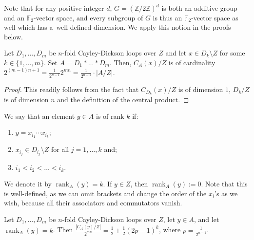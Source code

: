 \documentclass{jonasart}
\begin{document}
	Note that for any positive integer $d$, $G=(\mathbb{Z}/2\mathbb{Z})^d$ is both an additive group and an $\mathbb{F}_2$-vector space, and every subgroup of $G$ is thus an $\mathbb{F}_2$-vector space as well which has a~well-defined dimension. We apply this notion in the proofs below.

	\begin{proposition}\label{Cardinality}
		Let $D_1,\dots,D_m$ be $n$-fold Cayley-Dickson loops over $Z$ and let $x \in D_k \setminus Z$ for some $k \in \{1,\dots,m\}$. Set $A=D_1 \ast \dots \ast D_m$. Then, $C_A (x)/Z$ is of cardinality $2^{(m-1)n+1}=\frac{1}{2^{n-1}}2^{mn}=\frac{1}{2^{n-1}}\cdot|A/Z|$.
	\end{proposition}

	\begin{proof}
		This readily follows from the fact that $C_{D_k}(x)/Z$ is of dimension $1$, $D_k /Z$ is of dimension $n$ and the definition of the central product.
	\end{proof}

	We say that an element $y \in A$ is of rank $k$ if:
	\begin{enumerate}
		\item $y = x_{i_1}\cdots x_{i_k}$;
		\item $x_{i_j} \in D_{i_j}\setminus Z$ for all $j = 1,\dots,k$ and;
		\item $i_1 < i_2 < \dots < i_k$.
	\end{enumerate}
	We denote it by $\operatorname{rank}_A (y) = k$. If $y \in Z$, then $\operatorname{rank}_A (y):= 0$. Note that this is well-defined, as we can omit brackets and change the order of the $x_i$'s as we wish, because all their associators and commutators vanish.

	\begin{theorem}\label{recurrence}
		Let $D_1,\dots,D_m$ be $n$-fold Cayley-Dickson loops over $Z$, let $y \in A$, and let $\operatorname{rank}_A (y) = k$. Then $\frac{|C_A (y)/Z|}{2^{mn}}=\frac{1}{2}+\frac{1}{2}(2p-1)^k$, where $p=\frac{1}{2^{n-1}}$.
	\end{theorem}
\end{document}
